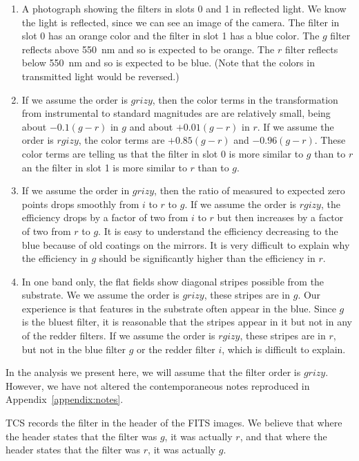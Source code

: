 \documentclass{article}
\begin{document}
\begin{enumerate}
    \item A photograph showing the filters in slots 0 and 1 in reflected light. We know the light is reflected, since we can see an image of the camera. The filter in slot 0 has an orange color and the filter in slot 1 has a blue color. The $g$ filter reflects above 550~nm and so is expected to be orange. The $r$ filter reflects below 550~nm and so is expected to be blue. (Note that the colors in transmitted light would be reversed.)
    \item If we assume the order is $grizy$, then the color terms in the transformation from instrumental to standard magnitudes are are relatively small, being about $-0.1(g-r)$ in $g$ and about $+0.01(g-r)$ in $r$. If we assume the order is $rgizy$, the color terms are $+0.85(g-r)$ and $-0.96(g-r)$. These color terms are telling us that the filter in slot 0 is more similar to $g$ than to $r$ an the filter in slot 1 is more similar to $r$ than to $g$.
    \item If we assume the order in $grizy$, then the ratio of measured to expected zero points drops smoothly from $i$ to $r$ to $g$. If we assume the order is $rgizy$, the efficiency drops by a factor of two from $i$ to $r$ but then increases by a factor of two from $r$ to $g$. It is easy to understand the efficiency decreasing to the blue because of old coatings on the mirrors. It is very difficult to explain why the efficiency in $g$ should be significantly higher than the efficiency in $r$.
    \item In one band only, the flat fields show diagonal stripes possible from the substrate. We we assume the order is $grizy$, these stripes are in $g$. Our experience is that features in the substrate often appear in the blue. Since $g$ is the bluest filter, it is reasonable that the stripes appear in it but not in any of the redder filters. If we assume the order is $rgizy$, these stripes are in $r$, but not in the blue filter $g$ or the redder filter $i$, which is difficult to explain.
\end{enumerate}

In the analysis we present here, we will assume that the filter order is $grizy$. However, we have not altered the contemporaneous notes reproduced in Appendix~\ref{appendix:notes}.

TCS records the filter in the header of the FITS images. We believe that where the header states that the filter was $g$, it was actually $r$, and that where the header states that the filter was $r$, it was actually $g$.
\end{document}
